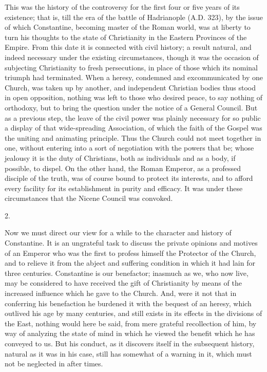 This was the history of the controversy for the first four or five
years of its existence; that is, till the era of the battle of
Hadrianople (A.D. 323), by the issue of which
Constantine, becoming master of the Roman world, was at liberty to
turn his thoughts to the state of Christianity in the Eastern
Provinces of the Empire. From this date it is connected with civil
history; a result natural, and indeed necessary under the existing
circumstances, though it was the occasion of subjecting Christianity
to fresh persecutions, in place of those which its nominal triumph had
terminated. When a heresy, condemned and excommunicated by one Church,
was taken up by another, and independent Christian bodies thus stood
in open opposition, nothing was left to those who desired peace, to
say nothing of orthodoxy, but to bring the question under the notice
of a General Council. But as a previous step, the leave of the civil
power was plainly necessary for so public a display of that
wide-spreading Association, of which the faith of the Gospel was the
uniting and animating principle. Thus the Church could not meet
together in one, without entering into a sort of negotiation with the
powers that be; whose jealousy it is the duty of Christians, both as
individuals and as a body, if possible, to dispel. On the other hand,
the Roman Emperor, as a professed disciple of the truth, was of course
bound to protect its interests, and to afford every facility for its
establishment in purity and efficacy. It was under these circumstances
that the Nicene Council was convoked.

2.

Now we must direct our view for a while to the character and
history of Constantine. It is an ungrateful task to discuss the
private opinions and motives of an Emperor who was the first to
profess himself the Protector of the Church, and to relieve it from
the abject and suffering condition in which it had lain for three
centuries. Constantine is our benefactor; inasmuch as we, who now
live, may be considered to have received the gift of Christianity by
means of the increased influence which he gave to the Church. And,
were it not that in conferring his benefaction he burdened it with the
bequest of an heresy, which outlived his age by many centuries, and
still exists in its effects in the divisions of the East, nothing
would here be said, from mere grateful recollection of him, by way of
analyzing the state of mind in which he viewed the benefit which he
has conveyed to us. But his conduct, as it discovers itself in the
subsequent history, natural as it was in his case, still has somewhat
of a warning in it, which must not be neglected in after times.

